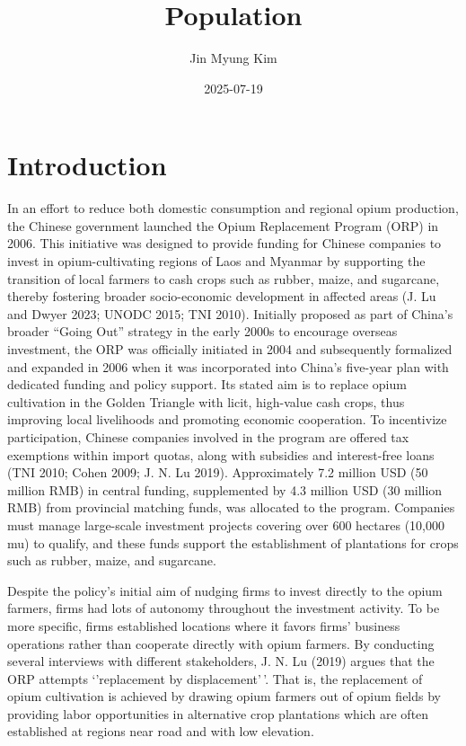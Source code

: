 \documentclass[
  letterpaper,
  DIV=11,
  numbers=noendperiod]{scrartcl}
\title{Population}
\author{Jin Myung Kim}
\date{2025-07-19}
\renewcommand*\contentsname{Table of contents}
\newcommand\contentsname{Table of contents}
\begin{document}
\maketitle

\renewcommand*\contentsname{Table of contents}
{
\hypersetup{linkcolor=}
\setcounter{tocdepth}{2}
\tableofcontents
}

\section{Introduction}\label{introduction}

In an effort to reduce both domestic consumption and regional opium
production, the Chinese government launched the Opium Replacement
Program (ORP) in 2006. This initiative was designed to provide funding
for Chinese companies to invest in opium-cultivating regions of Laos and
Myanmar by supporting the transition of local farmers to cash crops such
as rubber, maize, and sugarcane, thereby fostering broader
socio-economic development in affected areas (J. Lu and Dwyer 2023;
UNODC 2015; TNI 2010). Initially proposed as part of China's broader
``Going Out'' strategy in the early 2000s to encourage overseas
investment, the ORP was officially initiated in 2004 and subsequently
formalized and expanded in 2006 when it was incorporated into China's
five-year plan with dedicated funding and policy support. Its stated aim
is to replace opium cultivation in the Golden Triangle with licit,
high-value cash crops, thus improving local livelihoods and promoting
economic cooperation. To incentivize participation, Chinese companies
involved in the program are offered tax exemptions within import quotas,
along with subsidies and interest-free loans (TNI 2010; Cohen 2009; J.
N. Lu 2019). Approximately 7.2 million USD (50 million RMB) in central
funding, supplemented by 4.3 million USD (30 million RMB) from
provincial matching funds, was allocated to the program. Companies must
manage large-scale investment projects covering over 600 hectares
(10,000 mu) to qualify, and these funds support the establishment of
plantations for crops such as rubber, maize, and sugarcane.

Despite the policy's initial aim of nudging firms to invest directly to
the opium farmers, firms had lots of autonomy throughout the investment
activity. To be more specific, firms established locations where it
favors firms' business operations rather than cooperate directly with
opium farmers. By conducting several interviews with different
stakeholders, J. N. Lu (2019) argues that the ORP attempts `'replacement
by displacement'\,'. That is, the replacement of opium cultivation is
achieved by drawing opium farmers out of opium fields by providing labor
opportunities in alternative crop plantations which are often
established at regions near road and with low elevation.
\end{document}
